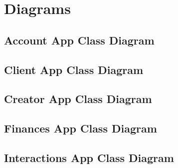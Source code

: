\documentclass[letterpaper,10pt,english]{sphinxmanual}
\begin{document}
\sphinxstepscope


\chapter{Diagrams}
\label{\detokenize{modules/diagrams:diagrams}}\label{\detokenize{modules/diagrams::doc}}

\section{Account App Class Diagram}
\label{\detokenize{modules/diagrams:account-app-class-diagram}}


\section{Client App Class Diagram}
\label{\detokenize{modules/diagrams:client-app-class-diagram}}


\section{Creator App Class Diagram}
\label{\detokenize{modules/diagrams:creator-app-class-diagram}}


\section{Finances App Class Diagram}
\label{\detokenize{modules/diagrams:finances-app-class-diagram}}


\section{Interactions App Class Diagram}
\label{\detokenize{modules/diagrams:interactions-app-class-diagram}}
\end{document}
